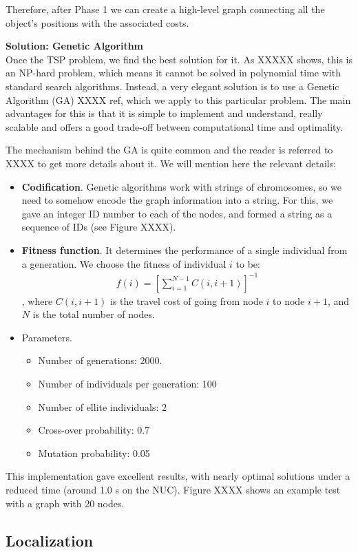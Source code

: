 Therefore, after Phase 1 we can create a high-level graph connecting all the object's positions with the associated costs. 

\textbf{Solution: Genetic Algorithm}\\
Once the TSP problem, we find the best solution for it. As XXXXX shows, this is an NP-hard problem, which means it cannot be solved in polynomial time with standard search algorithms. Instead, a very elegant solution is to use a Genetic Algorithm (GA) XXXX ref, which we apply to this particular problem. The main advantages for this is that it is simple to implement and understand, really scalable and offers a good trade-off between computational time and optimality. 

The mechanism behind the GA is quite common and the reader is referred to XXXX to get more details about it. We will mention here the relevant details:
\begin{itemize}
\item \textbf{Codification}. Genetic algorithms work with strings of chromosomes, so we need to somehow encode the graph information into a string. For this, we gave an integer ID number to each of the nodes, and formed a string as a sequence of IDs (see Figure XXXX).
\item \textbf{Fitness function}. It determines the performance of a single individual from a generation. We choose the fitness of individual $i$ to be:
\begin{align}
f(i) = \left[\sum_{i = 1}^{N-1} C(i,i+1)\right]^{-1}
\end{align}
, where $C(i, i+1)$ is the travel cost of going from node $i$ to node $i+1$, and $N$ is the total number of nodes.
\item Parameters. 
\begin{itemize}
\item Number of generations: 2000.
\item Number of individuals per generation: 100
\item Number of ellite individuals: 2
\item Cross-over probability: 0.7
\item Mutation probability: 0.05
\end{itemize}
\end{itemize}

This implementation gave excellent results, with nearly optimal solutions under a reduced time (around 1.0 s on the NUC). Figure XXXX shows an example test with a graph with 20 nodes. 



\subsection{Localization}
